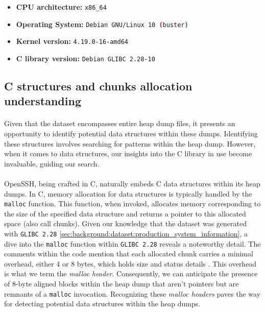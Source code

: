         \begin{itemize}
            \item \textbf{CPU architecture:} \lstinline[language=bash]|x86_64|
            \item \textbf{Operating System:} \lstinline[language=bash]|Debian GNU/Linux 10 (buster)|
            \item \textbf{Kernel version:} \lstinline[language=bash]|4.19.0-16-amd64|
            \item \textbf{C library version:} \lstinline[language=bash]|Debian GLIBC 2.28-10|
        \end{itemize}

    \subsection{C structures and chunks allocation understanding}\label{sec:background:dataset:c_structures_and_chunks_allocation_understanding}

        \paragraph{}Given that the dataset encompasses entire heap dump files, it presents an opportunity to identify potential data structures within these dumps. Identifying these structures involves searching for patterns within the heap dump. However, when it comes to data structures, our insights into the C library in use become invaluable, guiding our search.

        \paragraph{}OpenSSH, being crafted in C, naturally embeds C data structures within its heap dumps. In C, memory allocation for data structures is typically handled by the \lstinline[language=c]|malloc| function. This function, when invoked, allocates memory corresponding to the size of the specified data structure and returns a pointer to this allocated space (also call \glspl{chunk}). Given our knowledge that the dataset was generated with \texttt{GLIBC 2.28} \ref{sec:background:dataset:production_system_information}, a dive into the \lstinline[language=c]|malloc| function within \texttt{GLIBC 2.28} reveals a noteworthy detail. The comments within the code mention that each allocated \gls{chunk} carries a minimal overhead, either 4 or 8 bytes, which holds size and status details \cite{gloger_malloc_2001}. This overhead is what we term the \textit{malloc header}. Consequently, we can anticipate the presence of 8-byte aligned blocks within the heap dump that aren't pointers but are remnants of a \lstinline[language=c]|malloc| invocation. Recognizing these \textit{malloc headers} paves the way for detecting potential data structures within the heap dumps.

